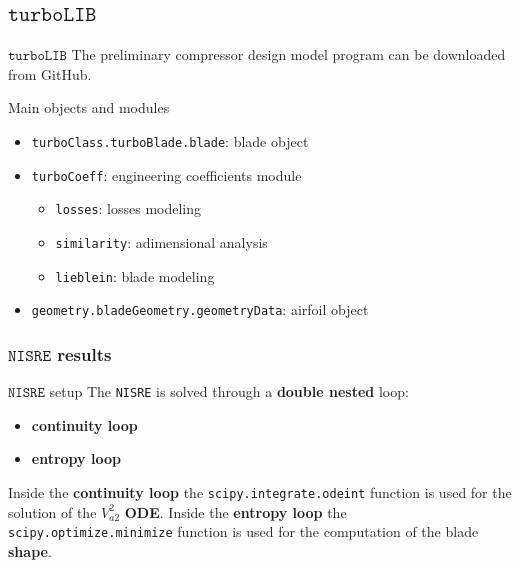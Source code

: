 \subsection{$\mathtt{turboLIB}$}
	\begin{frame}[fragile]{$\mathtt{turboLIB}$}
		The preliminary compressor design model program \href{https://github.com/antoniopucciarelli/turboLIB}{} can be downloaded from GitHub.
		\begin{block}{Main objects and modules}
			\begin{itemize}
				\item \verb|turboClass.turboBlade.blade|: blade object
				\item \verb|turboCoeff|: engineering coefficients module
					\begin{itemize}
						\item \verb|losses|: losses modeling 
						\item \verb|similarity|: adimensional analysis
						\item \verb|lieblein|: blade modeling
					\end{itemize}
				\item \verb|geometry.bladeGeometry.geometryData|: airfoil object
			\end{itemize}
		\end{block}
	\end{frame}
\subsubsection{$\mathtt{NISRE}$ results}
	\begin{frame}[fragile]{$\mathtt{NISRE}$ setup}
		The \verb|NISRE| is solved through a \textbf{double nested} loop:
		\begin{itemize}
			\item \textbf{continuity loop}
			\item \textbf{entropy loop}
		\end{itemize}
		Inside the \textbf{continuity loop} the \verb|scipy.integrate.odeint| function is used for the solution of the $V_{a2}^2$ \textbf{ODE}.
		\newline
		\newline
		Inside the \textbf{entropy loop} the \verb|scipy.optimize.minimize| function is used for the computation of the blade \textbf{shape}.
	\end{frame}

